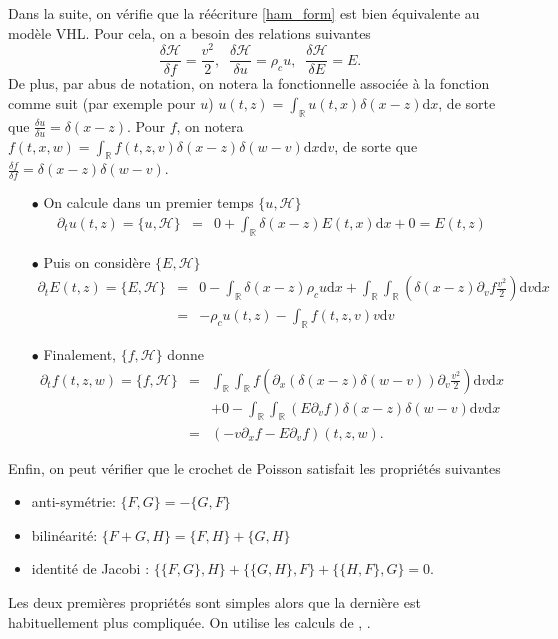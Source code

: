 Dans la suite, on vérifie que la réécriture \eqref{ham_form} est bien équivalente au modèle VHL. Pour cela, on a besoin des relations suivantes 
$$
  \frac{\delta \mathcal{H}}{\delta f} = \frac{v^2}{2}, \;\; \frac{\delta \mathcal{H}}{\delta u} = \rho_c u, \;\; \frac{\delta \mathcal{H}}{\delta E} = E. 
$$
De plus, par abus de notation, on notera la fonctionnelle associée à la fonction comme suit (par exemple pour $u$) $u(t, z)=\int_{\mathbb{R}} u(t, x)\delta(x-z) \mathrm{d}x$, de sorte que $ \frac{\delta u}{\delta u} = \delta(x-z)$. Pour $f$, on notera $f(t, x, w)=\int_{\mathbb{R}} f(t, z, v)\delta(x-z)\delta(w-v) \mathrm{d}x\mathrm{d}v$, de sorte que $ \frac{\delta f}{\delta f} = \delta(x-z)\delta(w-v)$.

\begin{enumerate}
  \item[$\bullet$] On calcule dans un premier temps $\{ u, \mathcal{H} \}$ 
    \begin{eqnarray*}
    \partial_t u(t, z) = \{ u, \mathcal{H} \} &=& 0+ \int_{\mathbb{R}}   \delta(x-z) E(t,x) \mathrm{d}x  + 0 = E(t,z)
    \end{eqnarray*}
  \item[$\bullet$] Puis on considère $\{ E, \mathcal{H} \}$ 
    \begin{eqnarray*}
    \partial_t E(t, z) = \{ E, \mathcal{H} \} &=& 0 -  \int_{\mathbb{R}}  \delta(x-z) \rho_c u \mathrm{d}x  +  \int_{\mathbb{R}}\int_{\mathbb{R}}  \left(  \delta(x-z)  \partial_v f \frac{v^2}{2}  \right) \mathrm{d}{ v}\mathrm{d}x \nonumber\\
    &=& - \rho_c u(t, z) - \int_{\mathbb{R}} f(t, z, v) v\mathrm{d}{ v} 
    \end{eqnarray*}
  \item[$\bullet$]  Finalement,  $\{ f, \mathcal{H} \}$ donne 
    \begin{eqnarray*}
    \partial_t f(t, z,w) = \{ f, \mathcal{H} \} &=&  \int_{\mathbb{R}}\int_{\mathbb{R}} f \left( \partial_x (\delta(x-z)\delta(w-v)) \partial_v \frac{v^2}{2}   \right)\mathrm{d}v \mathrm{d}x \nonumber\\
    && + 0  -  \int_{\mathbb{R}}\int_{\mathbb{R}}  \left( E  \partial_v f \right) \delta(x-z)  \delta(w-v)    \mathrm{d}{ v}\mathrm{d}x \nonumber\\
    &=& (- v\partial_x f - E\partial_v f)(t, z, w). 
    \end{eqnarray*}
\end{enumerate}

Enfin, on peut vérifier  que le crochet de Poisson satisfait les propriétés suivantes 
\begin{itemize}
  \item anti-symétrie: $\{ F, G \} = -\{ G, F \}$ 
  \item bilinéarité: $\{ F + G, H \} = \{ F, H \}+\{ G, H \}$ 
  \item identité de Jacobi : $\{\{ F, G \}, H\} + \{\{G,H\}, F \} + \{\{H, F\}, G \} = 0$.  
\end{itemize}
Les deux premières propriétés sont  simples alors que la dernière est habituellement plus compliquée. On utilise les calculs de \cite{Li:2020}, \cite{Morrison:2012}. 
